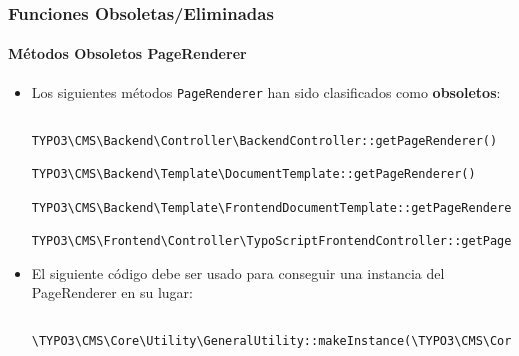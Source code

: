 \begin{frame}[fragile]
\begin{itemize}
	\end{itemize}

\end{frame}


\begin{frame}[fragile]
	\frametitle{Funciones Obsoletas/Eliminadas}
	\framesubtitle{Métodos Obsoletos PageRenderer}

	\lstset{basicstyle=\tiny\ttfamily}

	\begin{itemize}
		\item Los siguientes métodos \texttt{PageRenderer} han sido clasificados como \textbf{obsoletos}:

			\begin{lstlisting}
				TYPO3\CMS\Backend\Controller\BackendController::getPageRenderer()
				TYPO3\CMS\Backend\Template\DocumentTemplate::getPageRenderer()
				TYPO3\CMS\Backend\Template\FrontendDocumentTemplate::getPageRenderer()
				TYPO3\CMS\Frontend\Controller\TypoScriptFrontendController::getPageRenderer()
			\end{lstlisting}

		\item El siguiente código debe ser usado para conseguir una instancia del PageRenderer en su lugar:

			\begin{lstlisting}
				\TYPO3\CMS\Core\Utility\GeneralUtility::makeInstance(\TYPO3\CMS\Core\Page\PageRenderer::class)
			\end{lstlisting}

	\end{itemize}

\end{frame}


